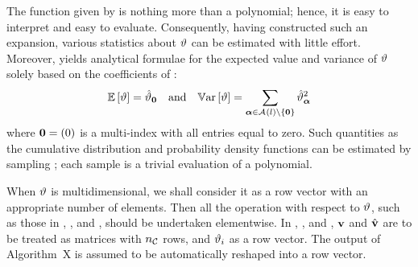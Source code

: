 The function given by  is nothing more than a polynomial; hence, it is easy to interpret and easy to evaluate.
Consequently, having constructed such an expansion, various statistics about $\vartheta$ can be estimated with little effort.
Moreover,  yields analytical formulae for the expected value and variance of $\vartheta$ solely based on the coefficients of :
\begin{equation} \elab{probabilistic-moments}
  \expectation{\w} = \coefficient{\w}_\vZero \hspace{1em} \text{and} \hspace{1em} \variance{\w} = \sum_{\multiindex \in \multiindexSet{\level} \setminus \{ \vZero \}} \coefficient{\w}_{\multiindex}^2
\end{equation}
where $\mathbf{0} = (0)$ is a multi-index with all entries equal to zero.
Such quantities as the cumulative distribution and probability density functions can be estimated by sampling ; each sample is a trivial evaluation of a polynomial.

\begin{remark} 
When $\vartheta$ is multidimensional, we shall consider it as a row vector with an appropriate number of elements.
Then all the operation with respect to $\vartheta$, such as those in , , and , should be undertaken elementwise.
In , , and , $\mathbf{v}$ and $\hat{\mathbf{v}}$ are to be treated as matrices with ${n_\mathcal{C}}$ rows, and $\vartheta_i$ as a row vector.
The output of Algorithm~X is assumed to be automatically reshaped into a row vector.
\end{remark}
